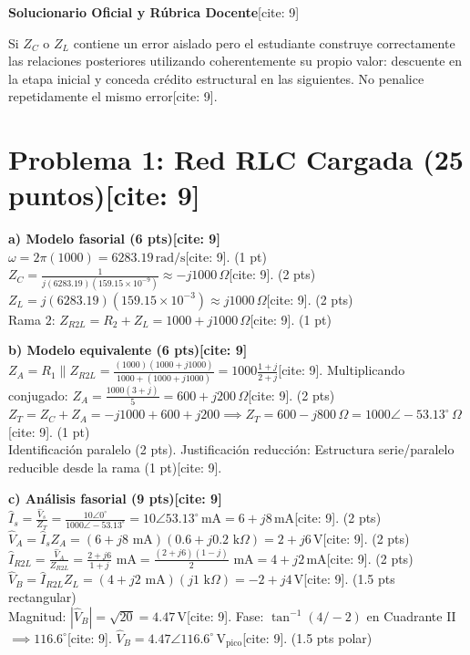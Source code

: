 \documentclass[11pt, a4paper]{article}
\begin{document}
\begin{center}
    \Large\textbf{\textcolor{ucbblue}{Solucionario Oficial y Rúbrica Docente}}[cite: 9]
\end{center}

\begin{tcolorbox}[colback=yellow!10, colframe=orange, title=\textbf{Guía de Errores Consecuenciales}]
    Si $Z_C$ o $Z_L$ contiene un error aislado pero el estudiante construye correctamente las relaciones posteriores utilizando coherentemente su propio valor: descuente en la etapa inicial y conceda crédito estructural en las siguientes. No penalice repetidamente el mismo error[cite: 9].
\end{tcolorbox}

\section*{Problema 1: Red RLC Cargada (25 puntos)[cite: 9]}

\textbf{a) Modelo fasorial (6 pts)[cite: 9]} \\
$\omega = 2\pi(1000) = \boxed{6283.19\,\text{rad/s}}$[cite: 9]. (1 pt) \\
$Z_C = \frac{1}{j(6283.19)(159.15\times10^{-9})} \approx \boxed{-j1000\,\Omega}$[cite: 9]. (2 pts) \\
$Z_L = j(6283.19)(159.15\times10^{-3}) \approx \boxed{j1000\,\Omega}$[cite: 9]. (2 pts) \\
Rama $2$: $Z_{R2L} = R_2 + Z_L = \boxed{1000 + j1000\,\Omega}$[cite: 9]. (1 pt)

\textbf{b) Modelo equivalente (6 pts)[cite: 9]} \\
$Z_A = R_1 \parallel Z_{R2L} = \frac{(1000)(1000+j1000)}{1000+(1000+j1000)} = 1000 \frac{1+j}{2+j}$[cite: 9]. Multiplicando conjugado: $Z_A = \frac{1000(3+j)}{5} = \boxed{600 + j200\,\Omega}$[cite: 9]. (2 pts) \\
$Z_T = Z_C + Z_A = -j1000 + 600 + j200 \implies \boxed{Z_T = 600 - j800\,\Omega = 1000\angle-53.13^\circ\,\Omega}$[cite: 9]. (1 pt) \\
Identificación paralelo (2 pts). Justificación reducción: Estructura serie/paralelo reducible desde la rama (1 pt)[cite: 9].

\textbf{c) Análisis fasorial (9 pts)[cite: 9]} \\
$\hat{I}_s = \frac{\hat{V}_s}{Z_T} = \frac{10\angle0^\circ}{1000\angle-53.13^\circ} = 10\angle53.13^\circ\,\text{mA} = 6 + j8\,\text{mA}$[cite: 9]. (2 pts) \\
$\hat{V}_A = \hat{I}_s Z_A = (6+j8\text{ mA})(0.6+j0.2\text{ k}\Omega) = \boxed{2 + j6\,\text{V}}$[cite: 9]. (2 pts) \\
$\hat{I}_{R2L} = \frac{\hat{V}_A}{Z_{R2L}} = \frac{2+j6}{1+j} \text{ mA} = \frac{(2+j6)(1-j)}{2} \text{ mA} = \boxed{4 + j2\,\text{mA}}$[cite: 9]. (2 pts) \\
$\hat{V}_B = \hat{I}_{R2L} Z_L = (4+j2\text{ mA})(j1\text{ k}\Omega) = \boxed{-2 + j4\,\text{V}}$[cite: 9]. (1.5 pts rectangular) \\
Magnitud: $|\hat{V}_B| = \sqrt{20} = 4.47\,\text{V}$[cite: 9]. Fase: $\tan^{-1}(4/-2)$ en Cuadrante II $\implies 116.6^\circ$[cite: 9]. $\boxed{\hat{V}_B = 4.47\angle116.6^\circ\,\text{V}_{\text{pico}}}$[cite: 9]. (1.5 pts polar)
\end{document}
